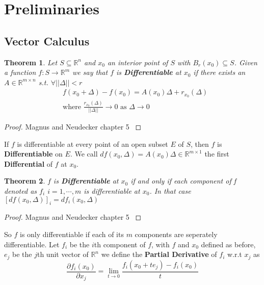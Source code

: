 \documentclass[]{article}
\theoremstyle{mattstyle}
\newtheorem{theorem}{Theorem}[section]
\theoremstyle{definition}
\begin{document}
\newpage

\section{Preliminaries}

\subsection{Vector Calculus}

\begin{theorem}
Let $S \subseteq \mathbb{R}^n$ and $x_0$ an interior point of $S$ with $B_r(x_0) \subseteq S$. Given a function $f: S \rightarrow \mathbb{R}^m$ we say that $f$ is \textbf{Differentiable} at $x_0$ if there exists an $A \in \mathbb{R}^{m \times n}$ s.t. $\forall ||\Delta|| < r$
\begin{align*}
&f(x_0 + \Delta) - f(x_0) = A(x_0)\Delta + r_{x_0}(\Delta)\\
&\text{where $\frac{r_{x_0}(\Delta)}{||\Delta||}\rightarrow 0$ as $\Delta \rightarrow 0$}
\end{align*}
\end{theorem}
\begin{proof}
	Magnus and Neudecker chapter 5 \cite{magnus1988matrix}
\end{proof}

If $f$ is differentiable at every point of an open subset $E$ of $S$, then $f$ is \textbf{Differentiable} on $E$. We call $df(x_0, \Delta) = A(x_0)\Delta \in \mathbb{R}^{m \times 1}$ the first \textbf{Differential} of $f$ at $x_0$.

\begin{theorem}
	$f$ is \textbf{Differentiable} at $x_0$ if and only if each component of f denoted as $f_i$ $i=1,\cdots, m$ is differentiable at $x_0$. In that case $[df(x_0, \Delta)]_i = df_i(x_0, \Delta)$
\end{theorem}
\begin{proof}
	Magnus and Neudecker chapter 5 \cite{magnus1988matrix}
\end{proof}

So $f$ is only differentiable if each of its $m$ components are seperately differentiable. Let $f_i$ be the $i$th component of $f$, with $f$ and $x_0$ defined as before, $e_j$ be the $j$th unit vector of $\mathbb{R}^n$ we define the \textbf{Partial Derivative} of $f_i$ w.r.t $x_j$ as
$$
\frac{\partial f_i(x_0)}{\partial x_j} = \lim\limits_{t \rightarrow 0} \frac{f_i(x_0+te_j) - f_i(x_0)}{t}
$$
\end{document}
